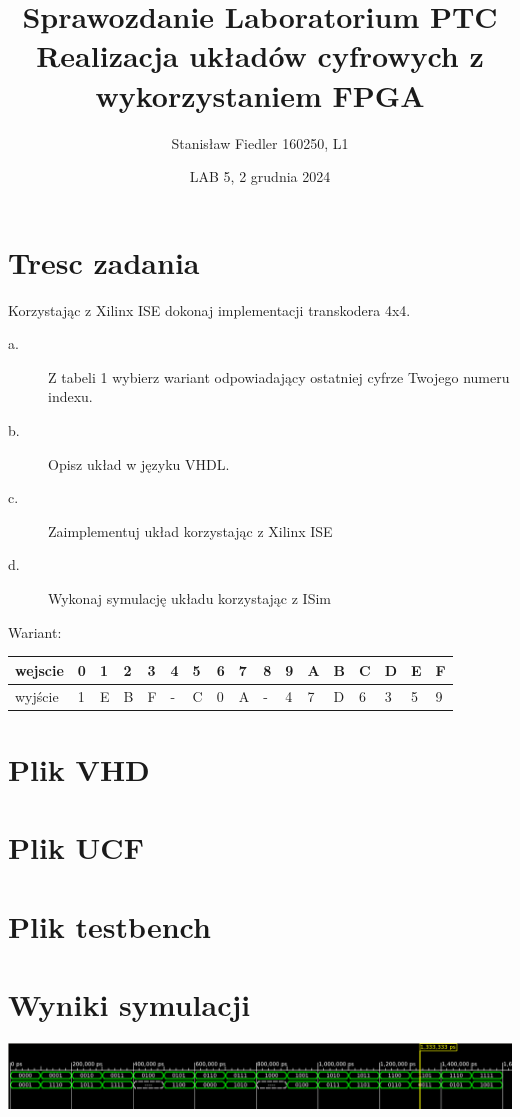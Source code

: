 \documentclass[a4paper, 11pt]{article}
\title{%
       \large Sprawozdanie Laboratorium PTC \\
       \huge Realizacja układów cyfrowych z wykorzystaniem FPGA}
\author{Stanisław Fiedler 160250, L1}
\date{LAB 5, 2 grudnia 2024}
\begin{document}
\maketitle

\section{Tresc zadania}\label{sec:tresc_zadania} %
Korzystając z Xilinx ISE dokonaj implementacji transkodera 4x4.
\begin{description}
	\item[a.] Z tabeli 1 wybierz wariant odpowiadający ostatniej cyfrze Twojego numeru indexu.
	\item[b.] Opisz układ w języku VHDL.
	\item[c.] Zaimplementuj układ korzystając z Xilinx ISE
	\item[d.] Wykonaj symulację układu korzystając z ISim
\end{description}
Wariant:
\vspace{0.3cm}

\begin{tabular}{l|llllllllllllllll}
	wejscie & 0 & 1 & 2 & 3 & 4 & 5 & 6 & 7 & 8 & 9 & A & B & C & D & E & F \\
	\hline
	wyjście & 1 & E & B & F & - & C & 0 & A & - & 4 & 7 & D & 6 & 3 & 5 & 9
\end{tabular}

\section{Plik VHD}\label{sec:plik_vhd} %


\section{Plik UCF}\label{sec:plik_ucf} %


\section{Plik testbench}\label{sec:plik_testbench} %


\section{Wyniki symulacji}\label{sec:wyniki_symulacji} %

\begin{center}
	\includegraphics[scale=0.6]{images/symulacja.png}
\end{center}
\end{document}
